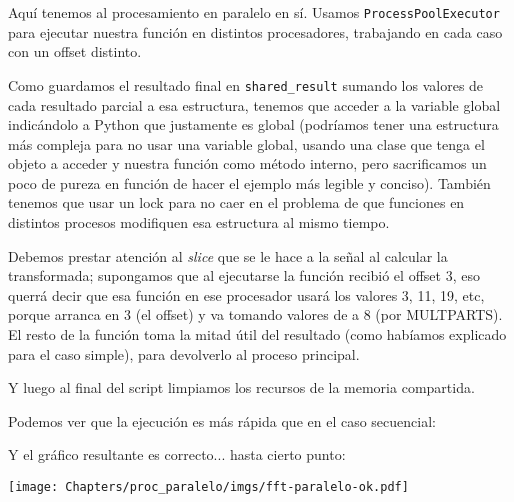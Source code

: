 
Aquí tenemos al procesamiento en paralelo en sí. Usamos \texttt{ProcessPoolExecutor} para ejecutar nuestra función en distintos procesadores, trabajando en cada caso con un offset distinto.

Como guardamos el resultado final en \texttt{shared\_result} sumando los valores de cada resultado parcial a esa estructura, tenemos que acceder a la variable global indicándolo a Python que justamente es global (podríamos tener una estructura más compleja para no usar una variable global, usando una clase que tenga el objeto a acceder y nuestra función como método interno, pero sacrificamos un poco de pureza en función de hacer el ejemplo más legible y conciso). También tenemos que usar un lock para no caer en el problema de que funciones en distintos procesos modifiquen esa estructura al mismo tiempo.

Debemos prestar atención al \textit{slice} que se le hace a la señal al calcular la transformada; supongamos que al ejecutarse la función recibió el offset 3, eso querrá decir que esa función en ese procesador usará los valores 3, 11, 19, etc, porque arranca en 3 (el offset) y va tomando valores de a 8 (por MULTPARTS). El resto de la función toma la mitad útil del resultado (como habíamos explicado para el caso simple), para devolverlo al proceso principal.


Y luego al final del script limpiamos los recursos de la memoria compartida.

Podemos ver que la ejecución es más rápida que en el caso secuencial:


Y el gráfico resultante es correcto... hasta cierto punto:

\begin{center}
    \texttt{[image: Chapters/proc\_paralelo/imgs/fft-paralelo-ok.pdf]}
\end{center}

